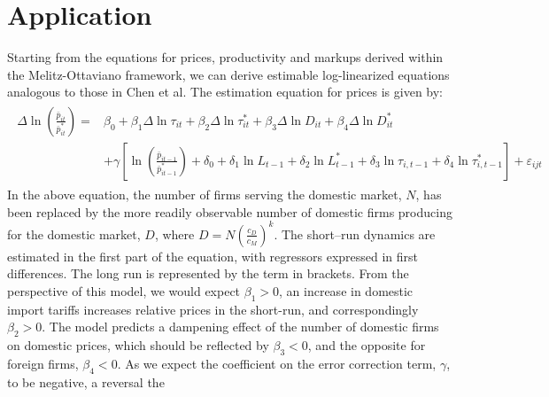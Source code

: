 \documentclass[a4paper,12pt]{article}
\begin{document}
\section{Application}\label{sec:app}
Starting from the equations for prices, productivity and markups derived within the Melitz-Ottaviano framework, we can derive estimable log-linearized equations analogous to those in Chen et al. The estimation equation for prices is given by:
\begin{align}
\begin{split}\label{eq:gw-estimation-prices}
\Delta \ln \left( \frac{\bar{p}_{it}}{\bar{p}_{it}^*} \right) = &\beta_0 + \beta_1 \Delta \ln \tau_{it} + \beta_2 \Delta \ln \tau_{it}^* + \beta_3 \Delta \ln D_{it} + \beta_4 \Delta \ln D_{it}^* \\ &+ \gamma \left[ \ln \left( \frac{\bar{p}_{it-1}}{\bar{p}_{it-1}^*} \right) + \delta_0 + \delta_1 \ln L_{t-1} + \delta_2\ln L_{t-1}^* + \delta_3 \ln  \tau_{i,t-1} + \delta_4 \ln  \tau_{i,t-1}^* \right] + \varepsilon_{ijt} 
\end{split}\end{align}
In the above equation, the number of firms serving the domestic market, $N$, has been replaced by the more readily observable number of domestic firms producing for the domestic market, $D$, where $D=N \left( \frac{c_D}{c_M} \right)^k$. The short--run dynamics are estimated in the first part of the equation, with regressors expressed in first differences. The long run is represented by the term in brackets. From the perspective of this model, we would expect $\beta_1>0$, an increase in domestic import tariffs increases relative prices in the short-run, and correspondingly $\beta_2>0$. The model predicts a dampening effect of the number of domestic firms on domestic prices, which should be reflected by $\beta_3<0$, and the opposite for foreign firms, $\beta_4<0$. As we expect the coefficient on the error correction term, $\gamma$, to be negative, a reversal the 
\end{document}
